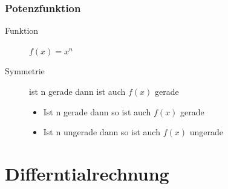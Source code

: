 \documentclass[a4paper]{scrartcl}
\begin{document}
        
        \subsubsection{Potenzfunktion}
           \begin{description}
               \item[Funktion] $f(x) = x^n$ 
               \item[Symmetrie] ist n gerade dann ist auch $f(x)$ gerade
               \begin{itemize}
                   \item Ist n gerade dann so ist auch $f(x)$ gerade
                   \item Ist n ungerade dann so ist auch $f(x)$ ungerade
               \end{itemize} 
           \end{description}       
    \newpage

    \section{Differntialrechnung}
\end{document}
